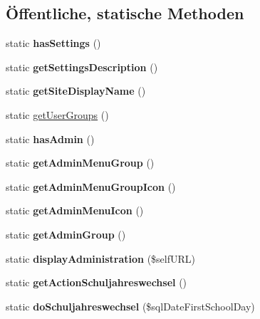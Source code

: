 \subsection*{Öffentliche, statische Methoden}
\begin{DoxyCompactItemize}
\item 
\mbox{\label{classschulkalender_a7ead91c62b639f2505515a4c519438d6}} 
static {\bfseries has\+Settings} ()
\item 
\mbox{\label{classschulkalender_ac3ee736e6a85c37b80d554f304fa63e6}} 
static {\bfseries get\+Settings\+Description} ()
\item 
\mbox{\label{classschulkalender_a3a5bd7f30423083541934c8a124e99a8}} 
static {\bfseries get\+Site\+Display\+Name} ()
\item 
static \mbox{\hyperlink{classschulkalender_adb45caaeceec2f212ceba5d882ffc089}{get\+User\+Groups}} ()
\item 
\mbox{\label{classschulkalender_a53dc6852ad6392620a84e2c9ff36f8fc}} 
static {\bfseries has\+Admin} ()
\item 
\mbox{\label{classschulkalender_ae12d6181849f7edafcc869917353b0ba}} 
static {\bfseries get\+Admin\+Menu\+Group} ()
\item 
\mbox{\label{classschulkalender_a38462f4de868fe71d1f9e42a47b0d046}} 
static {\bfseries get\+Admin\+Menu\+Group\+Icon} ()
\item 
\mbox{\label{classschulkalender_a6ae5d2e8c7fdf0333b5d4082b0dfa6b2}} 
static {\bfseries get\+Admin\+Menu\+Icon} ()
\item 
\mbox{\label{classschulkalender_acee031a73e816b295d822e07a045148b}} 
static {\bfseries get\+Admin\+Group} ()
\item 
\mbox{\label{classschulkalender_a3f47c28e37905f3ac12d2b2d229151f3}} 
static {\bfseries display\+Administration} (\$self\+U\+RL)
\item 
\mbox{\label{classschulkalender_a1b52cd114e73bc2bf362fab988ac311b}} 
static {\bfseries get\+Action\+Schuljahreswechsel} ()
\item 
\mbox{\label{classschulkalender_ac5358d0e8ddbfe83a687996dbab93b08}} 
static {\bfseries do\+Schuljahreswechsel} (\$sql\+Date\+First\+School\+Day)
\end{DoxyCompactItemize}
